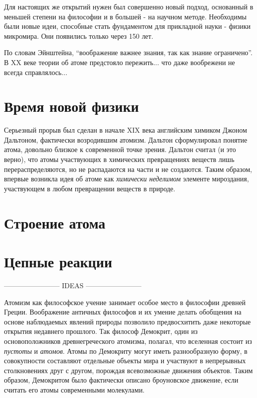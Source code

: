 Для настоящих же открытий нужен был совершенно новый подход, основанный в меньшей степени на философии и в большей - на научном методе. 
Необходимы были новые идеи, способные стать фундаментом для прикладной науки - физики микромира. 
Они появились только через 150 лет.

По словам Эйнштейна, ``воображение важнее знания, так как знание ограничено''.
В XX веке теории об атоме предстояло пережить... что даже вообрежени не всегда справлялось...


\section*{Время новой физики}

Серьезный прорыв был сделан в начале XIX века английским химиком Джоном Дальтоном, фактически возродившим атомизм. 
Дальтон сформулировал понятие атома, довольно близкое к современной точке зрения. 
Дальтон считал (и это верно), что атомы участвующих в химических превращениях веществ лишь перераспределяются, но не распадаются на части и не создаются. 
Таким образом, впервые возникла идея об атоме как \textit{химически неделимом} элементе мироздания, участвующем в любом превращении веществ в природе.


\section*{Строение атома}


\section*{Цепные реакции}


------------------------ IDEAS ------------------------ 





Атомизм как философское учение занимает особое место в философии древней Греции.
Воображение античных философов и их умение делать обобщения на основе наблюдаемых явлений природы позволило предвосхитить даже некоторые открытия недавнего прошлого.
Так философ Демокрит, один из основоположников древнегреческого атомизма, полагал, что вселенная состоит из \textit{пустоты} и \textit{атомов}. Атомы по Демокриту могут иметь разнообразную форму, в совокупности составляют отдельные объекты мира и участвуют в непрерывных столкновениях друг с другом, порождая всевозможные движения объектов.
Таким образом, Демокритом было фактически описано броуновское движение, если считать его атомы современными молекулами.

